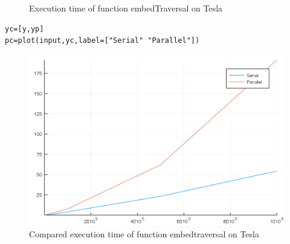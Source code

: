 \documentclass[a4paper,12pt]{article}
\begin{document}
\begin{figure}[!h]
\centering
{}
\caption{Execution time of function embedTraversal on Tesla}
\end{figure}
\noindent {}
\begin{Verbatim}[fontsize=\footnotesize]
yc=[y,yp]
pc=plot(input,yc,label=["Serial" "Parallel"])
\end{Verbatim}
\begin{figure}[!h]
\centering
\includegraphics[scale=0.08]{compembedtraversal.png}
\caption{Compared execution time of function embedtraversal on Tesla}
\end{figure}
\end{document}
